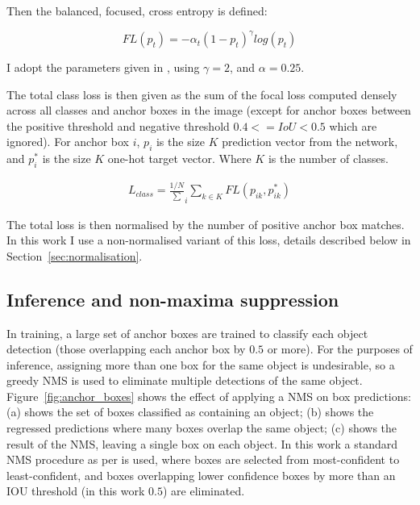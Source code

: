Then the balanced, focused, cross entropy is defined:

\begin{equation}
FL(p_t) = -\alpha_t (1 - p_t)^\gamma log(p_t)
\label{eq:focal_loss}
\end{equation}

I adopt the parameters given in \cite{Lin2017}, using $ \gamma = 2 $, and $ \alpha = 0.25 $. 

The total class loss is then given as the sum of the focal loss computed densely across all classes and anchor boxes in the image (except for anchor boxes between the positive threshold and negative threshold $0.4 <= IoU < 0.5$ which are ignored). For anchor box $i$, $p_i$ is the size $K$ prediction vector from the network, and $p^*_i$ is the size $K$ one-hot target vector. Where $K$ is the number of classes.

\begin{equation}
\begin{split}
L_{class} = \frac{1/N}\sum_i{\sum_{k \in K}FL(p_{ik}, p^*_{ik})}
\end{split}
\label{eq:total_loss}
\end{equation}

The total loss is then normalised by the number of positive anchor box matches. In this work I use a non-normalised variant of this loss, details described below in Section~\ref{sec:normalisation}.

\subsection{Inference and non-maxima suppression}

In training, a large set of anchor boxes are trained to classify each object detection (those overlapping each anchor box by $0.5$ or more). For the purposes of inference, assigning more than one box for the same object is undesirable, so a greedy \gls{NMS} is used to eliminate multiple detections of the same object. Figure~\ref{fig:anchor_boxes} shows the effect of applying a \gls{NMS} on box predictions: (a) shows the set of boxes classified as containing an object; (b) shows the regressed predictions where many boxes overlap the same object; (c) shows the result of the \gls{NMS}, leaving a single box on each object. In this work a standard \gls{NMS} procedure as per \cite{Wang2017} is used, where boxes are selected from most-confident to least-confident, and boxes overlapping lower confidence boxes by more than an \gls{IOU} threshold (in this work $0.5$) are eliminated.

